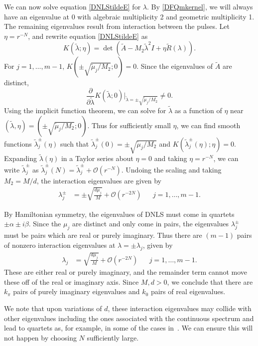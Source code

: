 \documentclass[12pt]{elsarticle}
\begin{document}
We can now solve equation \cref{DNLStildeE} for $\lambda$. By \cref{DFQmkernel}, we will always have an eigenvalue at 0 with algebraic multiplicity 2 and geometric multiplicity 1. The remaining eigenvalues result from interaction between the pulses. Let $\eta = r^{-N}$, and rewrite equation \cref{DNLStildeE} as 
\begin{equation}\label{DNLStildeE2}
K(\tilde{\lambda}; \eta) = \det(\tilde{A} - M_2 \tilde{\lambda}^2 I + \eta \tilde{R}(\lambda)).
\end{equation}
For $j = 1, \dots, m-1$, $K(\pm \sqrt{\tilde{\mu}_j / M_2 }; 0) = 0$. Since the eigenvalues of $\tilde{A}$ are distinct, 
\[
\frac{\partial}{\partial \tilde{\lambda}} K(\tilde{\lambda}; 0)\Big|_{\tilde{\lambda} = \pm \sqrt{\tilde{\mu}_j / M_2 }} \neq 0.
\]
Using the implicit function theorem, we can solve for $\tilde{\lambda}$ as a function of $\eta$ near $(\tilde{\lambda}, \eta) = (\pm \sqrt{\tilde{\mu}_j / M_2 }; 0)$. Thus for sufficiently small $\eta$, we can find smooth functions $\tilde{\lambda}_j^\pm(\eta)$ such that $\tilde{\lambda}_j^\pm(0) = \pm \sqrt{\tilde{\mu}_j / M_2 }$ and $K(\tilde{\lambda}_j^\pm(\eta); \eta) = 0$. Expanding $\tilde{\lambda}(\eta)$ in a Taylor series about $\eta = 0$ and taking $\eta = r^{-N}$, we can write $\tilde{\lambda}_j^\pm$ as $\tilde{\lambda}_j^\pm(N) = \tilde{\lambda}_j^\pm + \mathcal{O}(r^{-N})$. Undoing the scaling and taking $M_2 = M/d$, the interaction eigenvalues are given by
\begin{align*}
\lambda^\pm_j &= \pm \sqrt{\frac{d \mu_j}{M}} + \mathcal{O}(r^{-2N}) && j = 1, \dots, m-1 .
\end{align*}

By Hamiltonian symmetry, the eigenvalues of DNLS must come in quartets $\pm \alpha \pm i \beta$. Since the $\mu_j$ are distinct and only come in pairs, the eigenvalues $\lambda_j^\pm$ must be pairs which are real or purely imaginary. Thus there are $(m - 1)$ pairs of nonzero interaction eigenvalues at $\lambda = \pm \lambda_j$, given by 
\begin{align*}
\lambda_j &= \sqrt{\frac{d \mu_j}{M}} + \mathcal{O}(r^{-2N}) && j = 1, \dots, m-1.
\end{align*}
These are either real or purely imaginary, and the remainder term cannot move these off of the real or imaginary axis. Since $M, d > 0$, we conclude that there are $k_\pi$ pairs of purely imaginary eigenvalues and $k_0$ pairs of real eigenvalues.

We note that upon variations of $d$,
these interaction eigenvalues may collide with other eigenvalues including
the ones associated with the continuous spectrum
and lead to quartets as, for example, in some of the
cases in~\cite{Pelinovsky2005}. We can ensure this will not happen by choosing $N$ sufficiently large.
\end{document}
